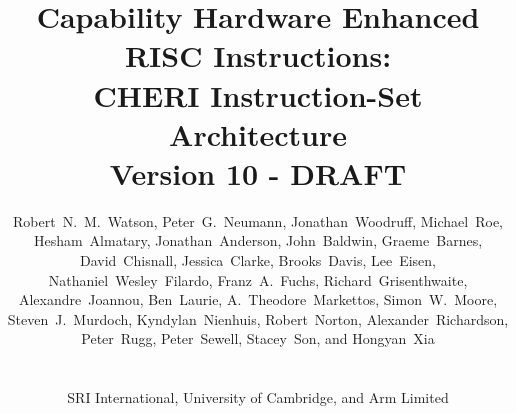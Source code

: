 \documentclass[12pt,twoside,openright,a4paper]{report}
\begin{document}
\title{Capability Hardware Enhanced RISC Instructions: \\
  \smallskip CHERI Instruction-Set Architecture \\
  {\large Version 10 - DRAFT}}
\author{
  \parbox{\linewidth}{\centering%
    Robert~N.~M.~Watson,
    Peter~G.~Neumann,
    Jonathan~Woodruff,
    Michael~Roe,
    Hesham~Almatary,
    Jonathan~Anderson,
    John~Baldwin,
    Graeme~Barnes,
    David~Chisnall,
    Jessica~Clarke,
    Brooks~Davis,
    Lee~Eisen,
    Nathaniel~Wesley~Filardo,
    Franz~A.~Fuchs,
    Richard~Grisenthwaite,
    Alexandre~Joannou,
    Ben~Laurie,
    A.~Theodore~Markettos,
    Simon~W.~Moore,
    Steven~J.~Murdoch,
    Kyndylan~Nienhuis,
    Robert~Norton,
    Alexander~Richardson,
    Peter~Rugg,
    Peter~Sewell,
    Stacey~Son, and
    Hongyan~Xia
  }%
  \\
  \\
  SRI International, University of Cambridge, and Arm Limited
}
\end{document}
